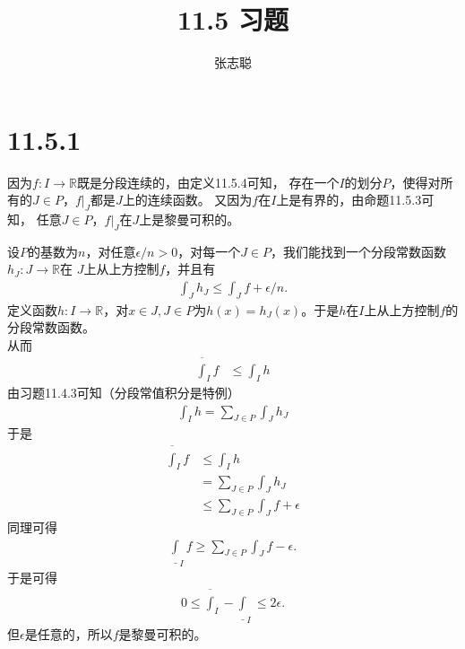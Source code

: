\documentclass{article}
\begin{document}
\title{11.5 习题}
\author{张志聪}
\maketitle

\section*{11.5.1}

因为$f: I \to \mathbb{R}$既是分段连续的，由定义11.5.4可知，
存在一个$I$的划分$P$，使得对所有的$J \in P$，$f|_J$都是$J$上的连续函数。
又因为$f$在$I$上是有界的，由命题11.5.3可知，
任意$J \in P$，$f|_J$在$J$上是黎曼可积的。

设$P$的基数为$n$，对任意$\epsilon/n > 0$，对每一个$J \in P$，我们能找到一个分段常数函数$h_J: J \to \mathbb{R}$在
$J$上从上方控制$f$，并且有
\begin{align*}
  \int_J h_J \leq \int_J f + \epsilon/n.
\end{align*}
定义函数$h: I \to \mathbb{R}$，对$x \in J, J \in P$为$h(x) = h_J(x)$。于是$h$在$I$上从上方控制$f$的分段常数函数。\\
从而
\begin{align*}
  \overline{\int}_I f & \leq \int_I h
\end{align*}
由习题11.4.3可知（分段常值积分是特例）
\begin{align*}
  \int_I h = \sum\limits_{J \in P} \int_J h_J
\end{align*}
于是
\begin{align*}
  \overline{\int}_I f & \leq \int_I h                                  \\
                      & = \sum\limits_{J \in P} \int_J h_J             \\
                      & \leq \sum\limits_{J \in P} \int_J f + \epsilon
\end{align*}
同理可得
\begin{align*}
  \underline{\int}_I f \geq \sum\limits_{J \in P} \int_J f - \epsilon.
\end{align*}
于是可得
\begin{align*}
  0 \leq \overline{\int}_I - \underline{\int}_I \leq 2\epsilon.
\end{align*}
但$\epsilon$是任意的，所以$f$是黎曼可积的。
\end{document}
